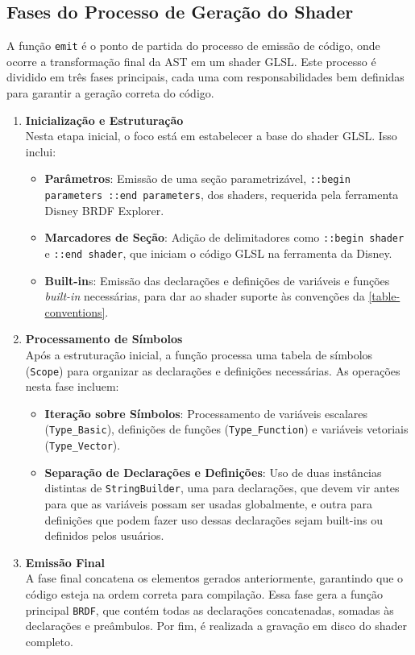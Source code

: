 \subsection{Fases do Processo de Geração do Shader}
\label{sub:start-emitting}

A função \verb"emit" é o ponto de partida do processo de emissão de código, onde ocorre a transformação final da AST em um shader GLSL. Este processo é dividido em três fases principais, cada uma com responsabilidades bem definidas para garantir a geração correta do código.

\begin{enumerate}
    \item \textbf{Inicialização e Estruturação} \\
    Nesta etapa inicial, o foco está em estabelecer a base do shader GLSL. Isso inclui:
    \begin{itemize}
        \item \textbf{Parâmetros}: Emissão de uma seção parametrizável, \verb"::begin parameters ::end parameters", dos shaders, requerida pela ferramenta Disney BRDF Explorer. 
        \item \textbf{Marcadores de Seção}: Adição de delimitadores como \verb|::begin shader| e \verb|::end shader|, que iniciam o código GLSL na ferramenta da Disney.
        \item \textbf{Built-in}s: Emissão das declarações e definições de variáveis e funções \textit{built-in} necessárias, para dar ao shader suporte às convenções da \autoref{table-conventions}.
    \end{itemize}

    \item \textbf{Processamento de Símbolos} \\
    Após a estruturação inicial, a função processa uma tabela de símbolos (\verb|Scope|) para organizar as declarações e definições necessárias. As operações nesta fase incluem:
    \begin{itemize}
        \item \textbf{Iteração sobre Símbolos}: Processamento de variáveis escalares (\verb|Type_Basic|), definições de funções (\verb|Type_Function|) e variáveis vetoriais (\verb|Type_Vector|).
        \item \textbf{Separação de Declarações e Definições}: Uso de duas instâncias distintas de \texttt{StringBuilder}, uma para declarações, que devem vir antes para que as variáveis possam ser usadas globalmente, e outra para definições que podem fazer uso dessas declarações sejam built-ins ou definidos pelos usuários.
    \end{itemize}

    \item \textbf{Emissão Final} \\
    A fase final concatena os elementos gerados anteriormente, garantindo que o código esteja na ordem correta para compilação. Essa fase gera a função principal \verb|BRDF|, que contém todas as declarações concatenadas, somadas às declarações e preâmbulos. Por fim, é realizada a gravação em disco do shader completo.
\end{enumerate}


